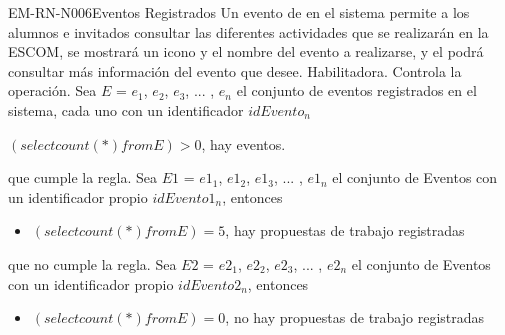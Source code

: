 \begin{BussinesRule}{EM-RN-N006}{Eventos Registrados}
	\BRitem[Descripción:]Un evento de en el sistema permite a los alumnos e invitados consultar las diferentes actividades que se realizarán en la ESCOM, se mostrará un icono y el nombre del evento a realizarse, y el podrá consultar más información del evento que desee. 
	\BRitem[Tipo:] Habilitadora.
	\BRitem[Nivel:] Controla la operación.
	\BRitem[Sentencia: ] Sea $E$ = {$e_{1}$, $e_{2}$, $e_{3}$, ... , $e_{n}$} el conjunto de eventos registrados en el sistema, cada uno con un identificador $idEvento_{n}$  
	\begin{center}
		$(select count(*) from E) > 0$, hay eventos.
	\end{center}
	
	 que cumple la regla.
		Sea $E1$ = {$e1_{1}$, $e1_{2}$, $e1_{3}$, ... , $e1_{n}$} el conjunto de Eventos con un identificador propio $idEvento1_{n}$, entonces 
		\begin{itemize}
			\item $(select count(*) from E) = 5$, hay propuestas de trabajo registradas 
			
		\end{itemize}
	 que no cumple la regla.
		Sea $E2$ = {$e2_{1}$, $e2_{2}$, $e2_{3}$, ... , $e2_{n}$} el conjunto de Eventos con un identificador propio $idEvento2_{n}$, entonces 
		\begin{itemize}
			\item $(select count(*) from E) = 0$, no hay propuestas de trabajo registradas 
			
		\end{itemize}
\end{BussinesRule}

